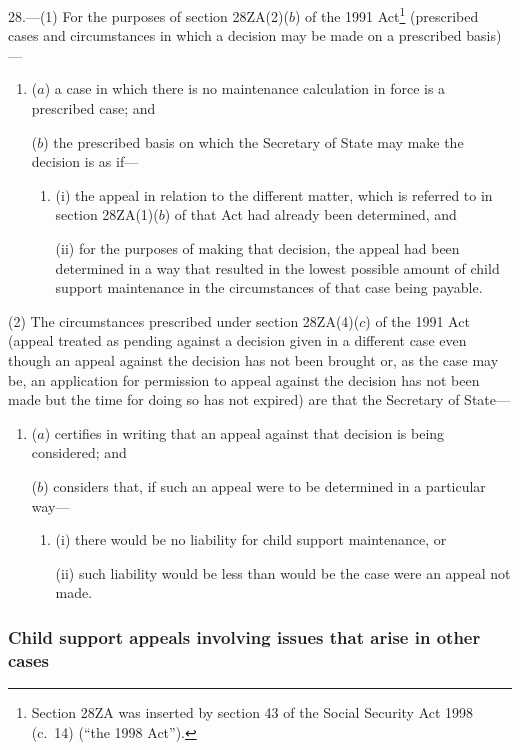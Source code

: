 \documentclass[12pt,a4paper]{article}
\begin{document}
28.---(1)  For the purposes of section 28ZA(2)($b$)  of the 1991 Act\footnote{Section 28ZA was inserted by section 43 of the Social Security Act 1998 (c.~14) (“the 1998 Act”).} (prescribed cases and circumstances in which a decision may be made on a prescribed basis)—
\begin{enumerate}\item[]
($a$) a case in which there is no maintenance calculation in force is a prescribed case; and

($b$) the prescribed basis on which the Secretary of State may make the decision is as if—
\begin{enumerate}\item[]
(i) the appeal in relation to the different matter, which is referred to in section 28ZA(1)($b$)  of that Act had already been determined, and

(ii) for the purposes of making that decision, the appeal had been determined in a way that resulted in the lowest possible amount of child support maintenance in the circumstances of that case being payable.
\end{enumerate}
\end{enumerate}

(2) The circumstances prescribed under section 28ZA(4)($c$)  of the 1991 Act (appeal treated as pending against a decision given in a different case even though an appeal against the decision has not been brought or, as the case may be, an application for permission to appeal against the decision has not been made but the time for doing so has not expired) are that the Secretary of State—
\begin{enumerate}\item[]
($a$) certifies in writing that an appeal against that decision is being considered; and

($b$) considers that, if such an appeal were to be determined in a particular way—
\begin{enumerate}\item[]
(i) there would be no liability for child support maintenance, or

(ii) such liability would be less than would be the case were an appeal not made.
\end{enumerate}
\end{enumerate}

\subsubsection[29. Child support appeals involving issues that arise in other cases]{Child support appeals involving issues that arise in other cases}
\end{document}
